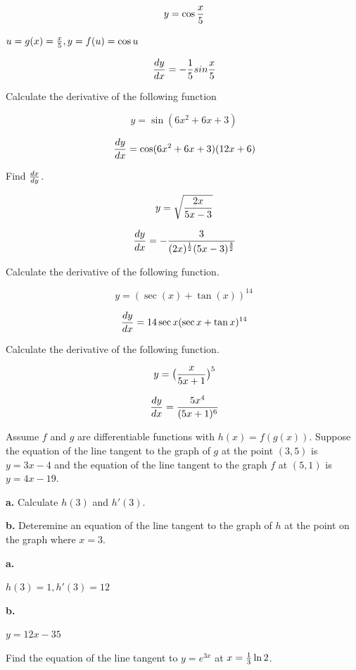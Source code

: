 $$\
y = \cos{x \over 5}
$$

$u = g(x) = {x \over 5}, y = f(u) = \cos u$

$$\
{dy \over dx} = -{1 \over 5} sin {x \over 5}
$$
\bigskip

\bigskip

Calculate the derivative of the following function

$$\
y = \sin(6x^2 + 6x + 3)
$$

$$\
{dy \over dx} = \cos(6x^2 + 6x + 3)(12x + 6)
$$
\bigskip

Find ${dx \over dy}$.

$$\
y = \sqrt{2x \over 5x - 3}
$$

$$\
{dy \over dx} = -{
3
\over
(2x)^{1 \over 2}
(5x - 3)^{3 \over 2}
}
$$

\bigskip

Calculate the derivative of the following function.

$$\
y = (\sec(x) + \tan(x))^{14}
$$

\solution{3.7.43}
$$\
{dy \over dx} = 14 \sec x(\sec x + \tan x)^{14}
$$
\bigskip

Calculate the derivative of the following function.

$$\
y = \big( {x \over 5x + 1} \big)^5
$$


$$\
{dy \over dx} = {
5x^4
\over
(5x + 1)^6
}
$$
\bigskip

Assume $f$ and $g$ are differentiable functions with
$h(x) = f(g(x))$. Suppose the equation of the line tangent
to the graph of $g$ at the point $(3, 5)$ is $y = 3x - 4$
and the equation of the line tangent to the graph $f$ at
$(5, 1)$ is $y = 4x - 19$.

\par {\bf a.} Calculate $h(3)$ and $h'(3)$.

\par {\bf b.} Deteremine an equation of the line tangent
to the graph of $h$ at the point on the graph where $x = 3$.

\solution{3.7.93}
{\par \bf a.} $h(3) = 1, h'(3) = 12$
{\par \bf b.} $y = 12x - 35$

\bigskip

Find the equation of the line tangent to $y = e^{3x}$ at
$x = {1 \over 3}\ln 2$.

